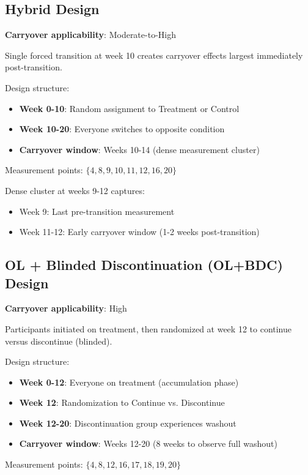 \documentclass[11pt,a4paper]{article}
\begin{document}
\subsection{Hybrid Design}

\textbf{Carryover applicability}: Moderate-to-High

Single forced transition at week 10 creates carryover effects largest immediately post-transition.

Design structure:
\begin{itemize}
  \item \textbf{Week 0-10}: Random assignment to Treatment or Control
  \item \textbf{Week 10-20}: Everyone switches to opposite condition
  \item \textbf{Carryover window}: Weeks 10-14 (dense measurement cluster)
\end{itemize}

Measurement points: $\{4, 8, 9, 10, 11, 12, 16, 20\}$

Dense cluster at weeks 9-12 captures:
\begin{itemize}
  \item Week 9: Last pre-transition measurement
  \item Week 11-12: Early carryover window (1-2 weeks post-transition)
\end{itemize}

\subsection{OL + Blinded Discontinuation (OL+BDC) Design}

\textbf{Carryover applicability}: High

Participants initiated on treatment, then randomized at week 12 to continue versus discontinue (blinded).

Design structure:
\begin{itemize}
  \item \textbf{Week 0-12}: Everyone on treatment (accumulation phase)
  \item \textbf{Week 12}: Randomization to Continue vs. Discontinue
  \item \textbf{Week 12-20}: Discontinuation group experiences washout
  \item \textbf{Carryover window}: Weeks 12-20 (8 weeks to observe full washout)
\end{itemize}

Measurement points: $\{4, 8, 12, 16, 17, 18, 19, 20\}$
\end{document}
